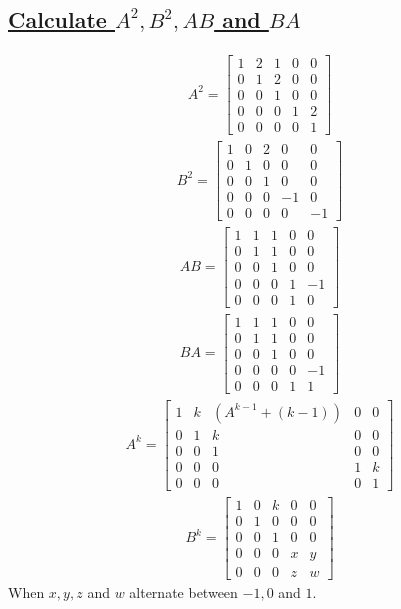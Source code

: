 \documentclass[a4paper, 12pt]{article}
\newcommand{\sub}[1]{\subsection{\underline{#1}}}
\newcommand{\eq}[1]{\begin{align*}#1\end{align*}}
\begin{document}
\begin{titlepage}
    
\end{titlepage}

\setcounter{section}{1}
\section{}
\sub{Calculate $A^2, B^2, AB$ and $BA$}
\eq{
    A^2=\begin{bmatrix}
        1&2&1&0&0\\
        0&1&2&0&0\\
        0&0&1&0&0\\
        0&0&0&1&2\\
        0&0&0&0&1
    \end{bmatrix}
}
\eq{
    B^2=\begin{bmatrix}
        1&0&2&0&0\\
        0&1&0&0&0\\
        0&0&1&0&0\\
        0&0&0&-1&0\\
        0&0&0&0&-1
    \end{bmatrix}
}
\eq{
    AB=\begin{bmatrix}
        1&1&1&0&0\\
        0&1&1&0&0\\
        0&0&1&0&0\\
        0&0&0&1&-1\\
        0&0&0&1&0
    \end{bmatrix}
}
\eq{
    BA=\begin{bmatrix}
        1&1&1&0&0\\
        0&1&1&0&0\\
        0&0&1&0&0\\
        0&0&0&0&-1\\
        0&0&0&1&1
    \end{bmatrix}
}
\eq{
    A^k=\begin{bmatrix}
        1&k&(A^{k-1}+(k-1))&0&0\\
        0&1&k&0&0\\
        0&0&1&0&0\\
        0&0&0&1&k\\
        0&0&0&0&1
    \end{bmatrix}
}
\eq{
    B^k=\begin{bmatrix}
        1&0&k&0&0\\
        0&1&0&0&0\\
        0&0&1&0&0\\
        0&0&0&x&y\\
        0&0&0&z&w
    \end{bmatrix}
}
When $x,y,z$ and $w$ alternate between $-1, 0$ and $1$.

\end{document}
